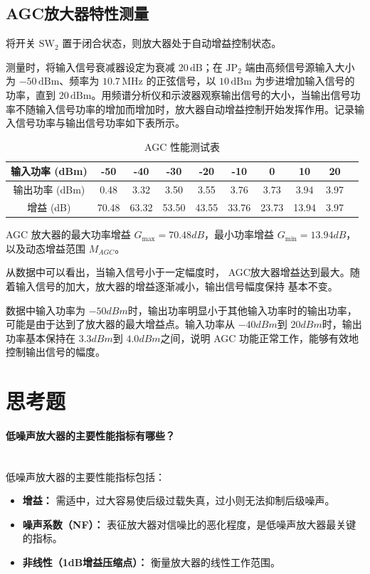 \documentclass[12pt]{article}
\begin{document}
\subsection{AGC放大器特性测量}
将开关 $\mathrm{SW}_2$ 置于闭合状态，则放大器处于自动增益控制状态。

测量时，将输入信号衰减器设定为衰减 $20\,\mathrm{dB}$；在 $\mathrm{JP}_2$ 端由高频信号源输入大小为 $-50\,\mathrm{dBm}$、频率为 $10.7\,\mathrm{MHz}$ 的正弦信号，以 $10\,\mathrm{dBm}$ 为步进增加输入信号的功率，直到 $20\,\mathrm{dBm}$。用频谱分析仪和示波器观察输出信号的大小，当输出信号功率不随输入信号功率的增加而增加时，放大器自动增益控制开始发挥作用。记录输入信号功率与输出信号功率如下表所示。

\begin{table}[htbp]
\centering
\caption{AGC 性能测试表}
\label{tab:agc_performance}
\begin{tabular}{|c|*{9}{c|}}
\hline
输入功率 (dBm) & -50 & -40 & -30 & -20 & -10 & 0 & 10 & 20 \\
\hline
输出功率 (dBm) & 0.48 & 3.32 & 3.50 & 3.55 & 3.76 & 3.73 & 3.94 & 3.97 \\
\hline
增益 (dB)      & 70.48 & 63.32 & 53.50 & 43.55 & 33.76 & 23.73 & 13.94 & 3.97 \\
\hline
\end{tabular}
\end{table}

AGC 放大器的最大功率增益 $G_{\max} = 70.48dB$，最小功率增益 $G_{\min} = 13.94dB$，以及动态增益范围 $M_{AGC}$。

从数据中可以看出，当输入信号小于一定幅度时，
AGC放大器增益达到最大。随着输入信号的加大，放大器的增益逐渐减小，输出信号幅度保持
基本不变。

数据中输入功率为 $-50 dBm$时，输出功率明显小于其他输入功率时的输出功率，可能是由于达到了放大器的最大增益点。输入功率从
$-40 dBm$到 $20 dBm$时，输出功率基本保持在 $3.3 dBm$到 $4.0 dBm$之间，说明 AGC 功能正常工作，能够有效地控制输出信号的幅度。

\section{思考题}
\paragraph{低噪声放大器的主要性能指标有哪些？}~\\
低噪声放大器的主要性能指标包括：
\begin{itemize}
    \item \textbf{增益：} 需适中，过大容易使后级过载失真，过小则无法抑制后级噪声。
    \item \textbf{噪声系数（NF）：} 表征放大器对信噪比的恶化程度，是低噪声放大器最关键的指标。
    \item \textbf{非线性（1dB增益压缩点）：} 衡量放大器的线性工作范围。
\end{itemize}
\end{document}
